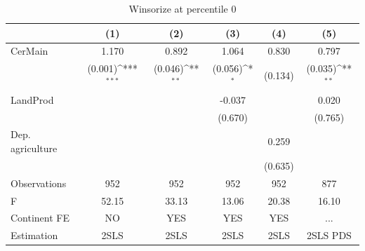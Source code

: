 \documentclass[12pt,a4paper]{article}
\begin{document}
\begin{table}[htbp]\centering
\def\sym#1{\ifmmode^{#1}\else\(^{#1}\)\fi}
\caption{Winsorize at percentile 0}
\begin{tabular}{l*{5}{c}}
\hline\hline
                &\multicolumn{1}{c}{(1)}         &\multicolumn{1}{c}{(2)}         &\multicolumn{1}{c}{(3)}         &\multicolumn{1}{c}{(4)}         &\multicolumn{1}{c}{(5)}         \\
\hline
CerMain         &    1.170         &    0.892         &    1.064         &    0.830         &    0.797         \\
                &  (0.001)\sym{***}&  (0.046)\sym{**} &  (0.056)\sym{*}  &  (0.134)         &  (0.035)\sym{**} \\
LandProd        &                  &                  &   -0.037         &                  &    0.020         \\
                &                  &                  &  (0.670)         &                  &  (0.765)         \\
Dep. agriculture&                  &                  &                  &    0.259         &                  \\
                &                  &                  &                  &  (0.635)         &                  \\
\hline
Observations    &      952         &      952         &      952         &      952         &      877         \\
F               &    52.15         &    33.13         &    13.06         &    20.38         &    16.10         \\
Continent FE    &       NO         &      YES         &      YES         &      YES         &      ...         \\
Estimation      &     2SLS         &     2SLS         &     2SLS         &     2SLS         & 2SLS PDS         \\
\hline\hline
\end{tabular}
\end{table}
\end{document}
